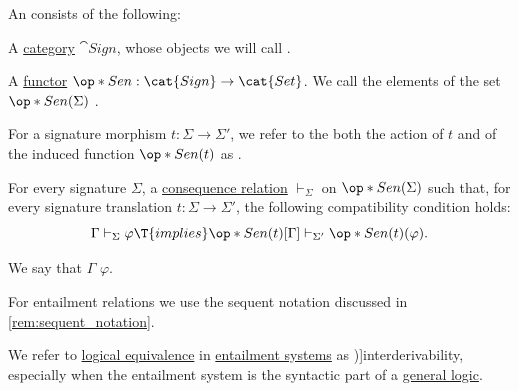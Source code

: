 \begin{definition}\label{def:entailment_system}
  An  consists of the following:
  \begin{thmenum}
     A \hyperref[def:category]{category} \( \cat{Sign} \), whose objects we will call .

     A \hyperref[def:functor]{functor} \( \op*{Sen}: \cat{Sign} \to \cat{Set} \). We call the elements of the set \( \op*{Sen}(\Sigma) \) .

    For a signature morphism \( t: \Sigma \to \Sigma' \), we refer to the both the action of \( t \) and of the induced function \( \op*{Sen}(t) \) as .

     For every signature \( \Sigma \), a \hyperref[def:consequence_relation]{consequence relation} \( \vdash_\Sigma \) on \( \op*{Sen}(\Sigma) \) such that, for every signature translation \( t: \Sigma \to \Sigma' \), the following compatibility condition holds:
    \begin{equation}\label{eq:def:entailment_system/entailment}
      \Gamma \vdash_\Sigma \varphi \T{implies} \op*{Sen}(t)[\Gamma] \vdash_{\Sigma'} \op*{Sen}(t)(\varphi).
    \end{equation}

    We say that \( \Gamma \)  \( \varphi \).
  \end{thmenum}
\end{definition}
\begin{comments}
  \item For entailment relations we use the sequent notation discussed in \cref{rem:sequent_notation}.
\end{comments}

\begin{definition}\label{def:interderivability}\mimprovised
  We refer to \hyperref[def:logical_equivalence]{logical equivalence} in \hyperref[def:entailment_system]{entailment systems} as \term[ru=синтактическая эквивалентность (\cite[136]{Герасимов2014Вычислимость})]{interderivability}, especially when the entailment system is the syntactic part of a \hyperref[def:general_logic]{general logic}.
\end{definition}

